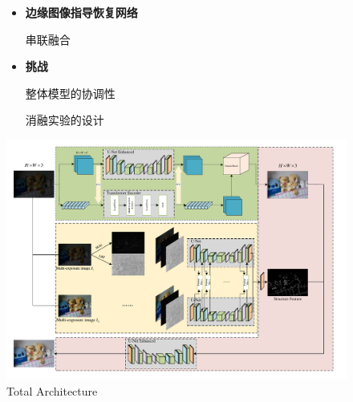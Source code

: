 \documentclass[CJK,aspectratio=169]{beamer}  %
\begin{document}
\begin{frame}
\begin{figure}
\begin{minipage}{.4\columnwidth}
\begin{itemize}
					{ 多曝光架构}
					
					{ 融合HOG和LBP图像}
					
					
					\item \textbf{边缘图像指导恢复网络}
					
					{ 串联融合}
					
					\item \textbf{挑战}
					
					{ 整体模型的协调性}
					
					{ 消融实验的设计}
				\end{itemize}
			\end{minipage}
			\begin{minipage}{.58\columnwidth}
				\setlength{\abovecaptionskip}{-0.05cm}
				\centering 
				\includegraphics[width=\textwidth]{picture/LLIE/My Architecture/Total architecture}
				\captionsetup{font=scriptsize}
				\caption{
					\label{fig: Total architecture}
					Total Architecture
				}
			\end{minipage}
		\end{figure}
		
	\end{frame}
	
\end{document}
